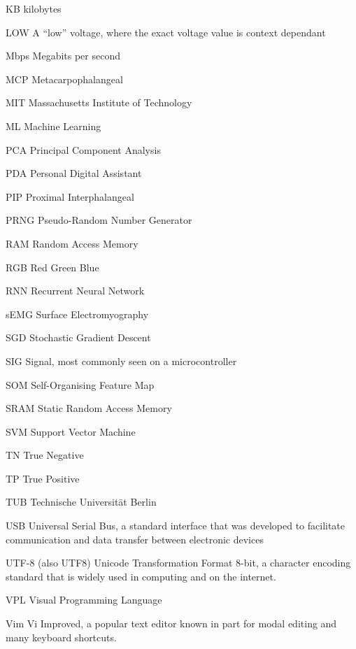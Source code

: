 \begin{Nomencl}[1cm]
    \item[KB] kilobytes
    \item[LOW] A ``low'' voltage, where the exact voltage value is context dependant
    \item[Mbps] Megabits per second
    \item[MCP] Metacarpophalangeal
    \item[MIT] Massachusetts Institute of Technology
    \item[ML] Machine Learning
    \item[PCA] Principal Component Analysis
    \item[PDA] Personal Digital Assistant
    \item[PIP] Proximal Interphalangeal
    \item[PRNG] Pseudo-Random Number Generator
    \item[RAM] Random Access Memory
    \item[RGB] Red Green Blue
    \item[RNN] Recurrent Neural Network
    \item[sEMG] Surface Electromyography
    \item[SGD] Stochastic Gradient Descent
    \item[SIG] Signal, most commonly seen on a microcontroller
    \item[SOM] Self-Organising Feature Map
    \item[SRAM] Static Random Access Memory
    \item[SVM] Support Vector Machine
    \item[TN] True Negative
    \item[TP] True Positive
    \item[TUB] Technische Universität Berlin
    \item[USB] Universal Serial Bus, a standard interface that was developed to
        facilitate communication and data transfer between electronic devices
    \item[UTF-8] (also UTF8) Unicode Transformation Format 8-bit, a character
        encoding standard that is widely used in computing and on the internet.
    \item[VPL] Visual Programming Language
    \item[Vim] Vi Improved, a popular text editor known in part for modal
        editing and many keyboard shortcuts.
\end{Nomencl}

